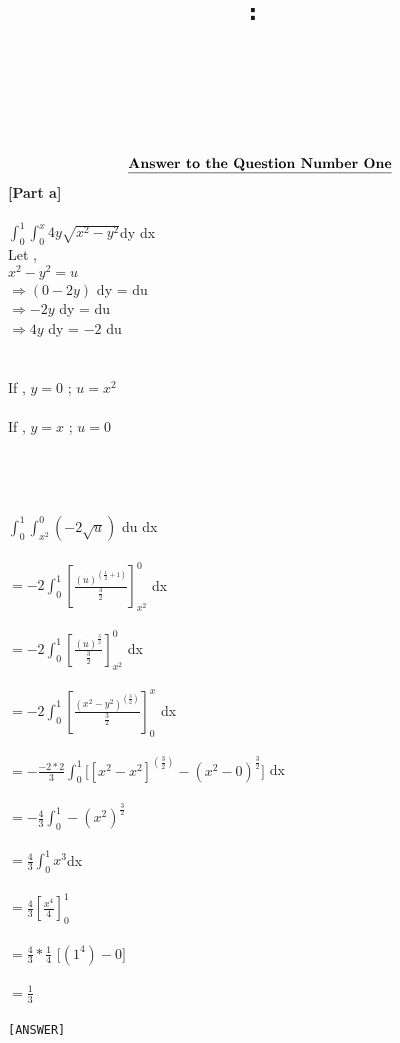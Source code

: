 \documentclass{article}
\title{
    \vspace{2in}
    \textmd{\texttt{\textbf{\hmwkClass:\ \hmwkTitle}}}\\
    \normalsize\vspace{0.2in}{\texttt{\textbf{\normalsize \hmwkDueDate}}}\\
    \vspace{0.1in}\large{\texttt{\hmwkClassInstructor\ \hmwkClassTime}}
    \vspace{2in}
}
\author{\texttt{\hmwkAuthorName}}
\newcommand\tab[1][1cm]{\hspace*{#1}}
\begin{document}
\maketitle


                
\begin{homeworkProblem}
    \[      \textbf{\underline{Answer to the Question Number One}}
    \]
    \textbf{[Part a]}\\
    \vspace{5mm}\\
    \tab $\int^1_0 \int^x_0 4y \sqrt{x^2 - y^2}$dy dx 
\\

Let , \\
$ x^2 - y^2 = u$\\
$\Rightarrow (0-2y)$ dy = du\\
$\Rightarrow-2y$ dy = du \\
$\Rightarrow4y$ dy = $-2$ du\\
\\
\\ If , $y=0$ ; $u =x^2$\\
\\ If , $y=x$ ; $u=0$\\
\\
\\
\\
\\$\int^1_0 \int^0_{x^2}(-2\sqrt{u})$ du dx\\
\\$= -2 \int^1_0 \left[\frac{(u)^{(\frac{1}{2}+1)}}{\frac{3}{2}} \right]^0_{x^2} $ dx\\
\\$= -2 \int^1_0 \left[\frac{(u)^{\frac{3}{2}}}{\frac{3}{2}} \right]^0_{x^2} $ dx\\
\\$= -2 \int^1_0 \left[\frac{(x^2 - y^2)^{\left(\frac{3}{2}\right)}}{\frac{3}{2}} \right]^x_{0} $ dx\\
\\$=-\frac{-2*2}{3} \int^1_0\big[[x^2 - x^2]^{\left(\frac{3}{2}\right)} - (x^2-0)^{\frac{3}{2}} \big] $ dx\\
\\$=-\frac{4}{3} \int^1_0 -(x^2)^{\frac{3}{2}} $\\
\\$=\frac{4}{3} \int^1_0x^3  $dx\\
\\$= \frac{4}{3}\left[\frac{x^4}{4}\right]^1_0 $\\
\\$= \frac{4}{3} * \frac{1}{4}$ $ \bigg[(1^4)- 0\bigg]$\\
\\$=\frac{1}{3}$\\
\vspace{3mm}\\
\tab\tab\tab\texttt{[ANSWER]}


\end{homeworkProblem}
\end{document}
